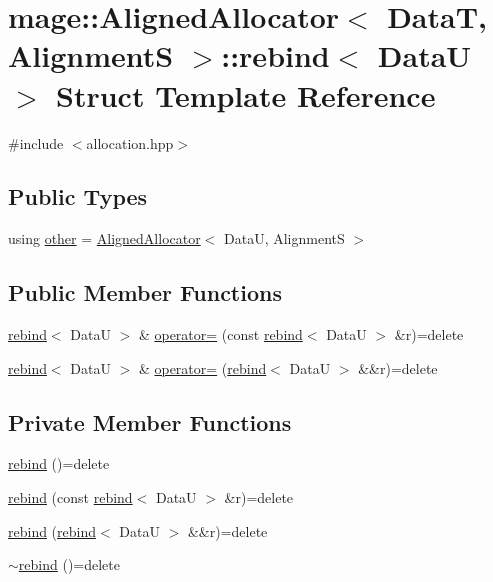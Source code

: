 \hypertarget{structmage_1_1_aligned_allocator_1_1rebind}{}\section{mage\+:\+:Aligned\+Allocator$<$ DataT, AlignmentS $>$\+:\+:rebind$<$ DataU $>$ Struct Template Reference}
\label{structmage_1_1_aligned_allocator_1_1rebind}


{\ttfamily \#include $<$allocation.\+hpp$>$}

\subsection*{Public Types}
\begin{DoxyCompactItemize}
\item 
using \hyperlink{structmage_1_1_aligned_allocator_1_1rebind_aeb2e9c9add001b8f603f5b67ad8fee56}{other} = \hyperlink{structmage_1_1_aligned_allocator}{Aligned\+Allocator}$<$ DataU, AlignmentS $>$
\end{DoxyCompactItemize}
\subsection*{Public Member Functions}
\begin{DoxyCompactItemize}
\item 
\hyperlink{structmage_1_1_aligned_allocator_1_1rebind}{rebind}$<$ DataU $>$ \& \hyperlink{structmage_1_1_aligned_allocator_1_1rebind_a2ce8caabcc8c6bab90e1314c12261a84}{operator=} (const \hyperlink{structmage_1_1_aligned_allocator_1_1rebind}{rebind}$<$ DataU $>$ \&r)=delete
\item 
\hyperlink{structmage_1_1_aligned_allocator_1_1rebind}{rebind}$<$ DataU $>$ \& \hyperlink{structmage_1_1_aligned_allocator_1_1rebind_a4345d236bd6d9abfc475ec575dc8dde2}{operator=} (\hyperlink{structmage_1_1_aligned_allocator_1_1rebind}{rebind}$<$ DataU $>$ \&\&r)=delete
\end{DoxyCompactItemize}
\subsection*{Private Member Functions}
\begin{DoxyCompactItemize}
\item 
\hyperlink{structmage_1_1_aligned_allocator_1_1rebind_a2b26e5afbed6b26f73ed0186c2ff52d6}{rebind} ()=delete
\item 
\hyperlink{structmage_1_1_aligned_allocator_1_1rebind_ad3132b0e4a5661ccb9fb33283ea4003e}{rebind} (const \hyperlink{structmage_1_1_aligned_allocator_1_1rebind}{rebind}$<$ DataU $>$ \&r)=delete
\item 
\hyperlink{structmage_1_1_aligned_allocator_1_1rebind_a0d0459ad0a109f7ba32cd9979d0c276d}{rebind} (\hyperlink{structmage_1_1_aligned_allocator_1_1rebind}{rebind}$<$ DataU $>$ \&\&r)=delete
\item 
\hyperlink{structmage_1_1_aligned_allocator_1_1rebind_a6d49df31fc4f0a5122267be6ab8888a7}{$\sim$rebind} ()=delete
\end{DoxyCompactItemize}


